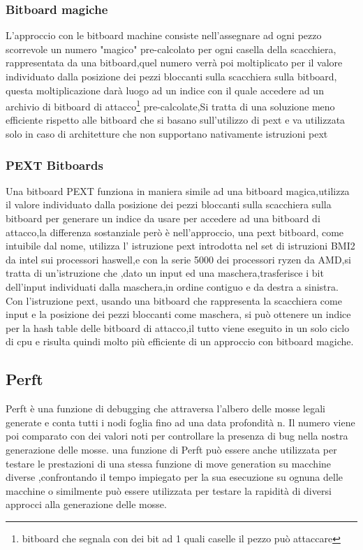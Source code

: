 \subsubsection{Bitboard magiche}
L'approccio con le bitboard machine consiste nell'assegnare ad ogni pezzo scorrevole un numero "magico" pre-calcolato per ogni casella della scacchiera, rappresentata da una bitboard,quel numero verrà poi moltiplicato
 per il valore individuato dalla posizione dei pezzi bloccanti sulla scacchiera sulla bitboard,
questa moltiplicazione darà luogo ad un indice con il quale accedere ad un archivio di bitboard di 
attacco\footnote{bitboard che segnala con dei bit ad 1 quali caselle il pezzo può attaccare} pre-calcolate,Si tratta di una soluzione meno efficiente rispetto alle bitboard che si basano sull'utilizzo di pext
e va utilizzata solo in caso di architetture che non supportano nativamente istruzioni pext


\subsubsection{PEXT Bitboards}
Una bitboard PEXT funziona in maniera simile ad una bitboard magica,utilizza il valore individuato dalla posizione dei pezzi bloccanti sulla scacchiera sulla bitboard per generare un indice da usare per accedere ad una
bitboard di attacco,la differenza sostanziale però è nell'approccio, una pext bitboard, come intuibile dal nome, utilizza l' istruzione pext introdotta nel set di istruzioni BMI2 da intel sui processori haswell,e con 
la serie 5000 dei processori ryzen da AMD,si tratta di un'istruzione che ,dato un input ed una maschera,trasferisce i bit dell'input individuati dalla maschera,in ordine contiguo e da destra a sinistra.
Con l'istruzione pext, usando una bitboard che rappresenta la scacchiera come input e la posizione dei pezzi bloccanti come maschera, si può ottenere un indice per la hash table delle bitboard di attacco,il tutto viene eseguito in un solo ciclo 
di cpu e risulta quindi molto più efficiente di un approccio con bitboard magiche.




\subsection{Perft}
Perft è una funzione di debugging che attraversa l'albero delle mosse legali generate e conta tutti i nodi foglia fino ad una data profondità n.
Il numero viene poi comparato con dei valori noti per controllare la presenza di bug nella nostra generazione delle mosse.
una funzione di Perft può essere anche utilizzata per testare le prestazioni di una stessa funzione di move generation su macchine diverse ,confrontando il tempo impiegato per la sua esecuzione su ognuna delle macchine
o similmente può essere utilizzata per testare la rapidità di diversi approcci alla generazione delle mosse.



